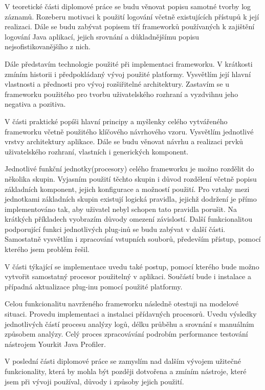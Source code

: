 \documentclass[ing,male,java,dept460]{diploma}		%
\begin{document}
\par V teoretické části diplomové práce se budu věnovat popisu samotné tvorby log záznamů. Rozeberu motivaci k použití logování včetně existujících přístupů k její realizaci. Dále se budu zabývat popisem tří frameworků používaných k zajištění logování Java aplikací, jejich srovnání a důkladnějšímu popisu nejsofistikovanějšího z nich.
\par Dále představím technologie použité při implementaci frameworku. V krátkosti zmíním historii i předpokládaný vývoj použité platformy. Vysvětlím její hlavní vlastnosti a přednosti pro vývoj rozšiřitelné architektury. Zastavím se u frameworku použitého pro tvorbu uživatelského rozhraní a vyzdvihnu jeho negativa a pozitiva.

\par V části praktické popíši hlavní principy a myšlenky celého vytvářeného frameworku včetně použitého klíčového návrhového vzoru. Vysvětlím jednotlivé vrstvy architektury aplikace. Dále se budu věnovat návrhu a realizaci prvků uživatelského rozhraní, vlastních i generických komponent.
\par Jednotlivé funkční jednotky(procesory) celého frameworku je možno rozdělit do několika skupin. Vyjasním použití těchto skupin i důvod rozdělení včetně popisu základních komponent, jejich konfigurace a možností použití. Pro vztahy mezi jednotkami základních skupin existují logická pravidla, jejichž dodržení je přímo implementováno tak, aby uživatel nebyl schopen tato pravidla porušit. Na krátkých příkladech vyobrazím důvody omezení závislostí. Další funkcionalitou podporující funkci jednotlivých plug-inů se budu zabývat v další části. Samostatně vysvětlím i zpracování vstupních souborů, především přístup, pomocí kterého jsem problém řešil.
\par V části týkající se implementace uvedu také postup, pomocí kterého bude možno vytvořit samostatný procesor použitelný v aplikaci. Součástí bude i instalace a případná aktualizace plug-inu pomocí použité platformy.

\par Celou funkcionalitu navrženého frameworku následně otestuji na modelové situaci. Provedu implementaci a instalaci přídavných procesorů. Uvedu výsledky jednotlivých částí procesu analýzy logů, délku průběhu a srovnání s manuálním způsobem analýzy. Celý proces zpracovávání podrobím performance testování nástrojem Yourkit Java Profiler.
\par V poslední části diplomové práce se zamyslím nad dalším vývojem užitečné funkcionality, která by mohla být později dotvořena a zmíním nástroje, které jsem při vývoji používal, důvody i způsoby jejich použití.
\end{document}
